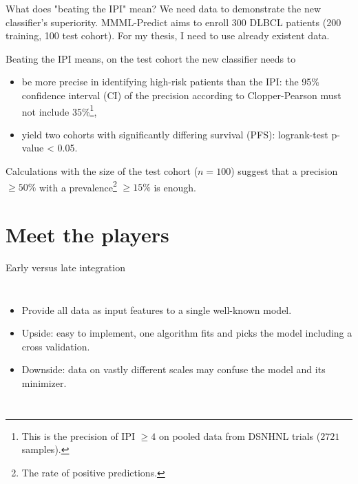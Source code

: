 \documentclass[10pt, aspectratio=169]{beamer}
\begin{document}
\begin{frame}{What does "beating the IPI" mean?}
  We need data to demonstrate the new classifier's superiority. MMML-Predict aims to enroll 300 DLBCL 
  patients (200 training, 100 test cohort). For my thesis, I need to use already existent data.

  Beating the IPI means, on the test cohort the new classifier needs to 

  \begin{itemize}
    \item be \alert{more precise in identifying high-risk patients} than the IPI: the 95\% confidence interval (CI) 
    of the precision according to Clopper-Pearson  
    must not include 35\%\footnote{This is the  precision of IPI $\geq 4$ on pooled data from DSNHNL trials 
    ($\num{2721}$ samples).},
    \item yield \alert{two cohorts with significantly differing survival} (PFS): logrank-test p-value < 0.05.
  \end{itemize}

  Calculations with the size of the test cohort ($n = 100$) suggest that a precision $\geq 50\%$ with a 
  prevalence\footnote{The rate of positive predictions.} $\geq 15\%$ is enough.
\end{frame}

\section{Meet the players}

\begin{frame}{\alert{Early} versus late integration}
  \begin{columns}
      \centering
      \begin{itemize}
        \item Provide all data as input features to a single well-known model.
        \item Upside: easy to implement, one algorithm fits and picks the model 
          including a cross validation.
        \item Downside: data on vastly different scales may confuse the model and 
          its minimizer.
      \end{itemize}
  \end{columns}
\end{frame}
\end{document}
